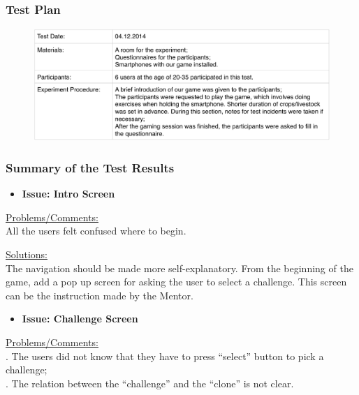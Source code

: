 \documentclass{article}
\begin{document}
\subsubsection{Test Plan}
\begin{figure}[H]
  \centering
  \includegraphics[width=0.9\linewidth]{TestPlan.png}
\end{figure}

\subsubsection{Summary of the Test Results}
\begin{itemize}
    \item{\textbf{Issue: Intro Screen}}
\end{itemize}

\underline{Problems/Comments:} \\\indent All the users felt confused where to begin.

\underline{Solutions:} \\\indent The navigation should be made more self-explanatory. From the beginning of the game, add a pop up screen for asking the user to select a challenge. This screen can be the instruction made by the Mentor.

\begin{itemize}
    \item{\textbf{Issue: Challenge Screen}}
\end{itemize}

\underline{Problems/Comments:} \\. The users did not know that they have to press “select” button to pick a challenge;\\
. The relation between the “challenge” and the “clone” is not clear.
\end{document}
